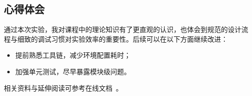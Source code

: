 \subsection{心得体会}

通过本次实验，我对课程中的理论知识有了更直观的认识，也体会到规范的设计流程与细致的调试习惯对实验效率的重要性。后续可以在以下方面继续改进：

\begin{itemize}
    \item 提前熟悉工具链，减少环境配置耗时；
    \item 加强单元测试，尽早暴露模块级问题。
\end{itemize}

相关资料与延伸阅读可参考在线文档~\cite{ctexdoc}。
